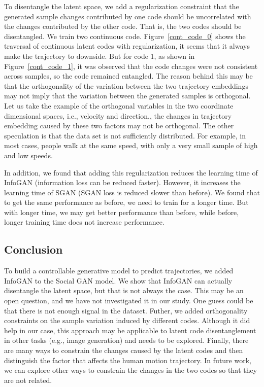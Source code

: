 To disentangle the latent space, we add a regularization constraint that the generated sample changes contributed by one code should be uncorrelated with the changes contributed by the other code. That is, the two codes should be disentangled. We train two continuous code. Figure~\ref{cont_code_0} shows the traversal of continuous latent codes with regularization, it seems that it always make the trajectory to downside. But for code 1, as shown in Figure~\ref{cont_code_1}, it was observed that the code changes were not consistent across samples, so the code remained entangled. The reason behind this may be that the orthogonality of the variation between the two trajectory embeddings may not imply that the variation between the generated samples is orthogonal. Let us take the example of the orthogonal variables in the two coordinate dimensional spaces, i.e., velocity and direction., the changes in trajectory embedding caused by these two factors may not be orthogonal. The other speculation is that the data set is not sufficiently distributed. For example, in most cases, people walk at the same speed, with only a very small sample of high and low speeds.

In addition, we found that adding this regularization reduces the learning time of InfoGAN (information loss can be reduced faster). However, it increases the learning time of SGAN (SGAN loss is reduced slower than before). We found that to get the same performance as before, we need to train for a longer time. But with longer time, we may get better performance than before, while before, longer training time does not increase performance.

\subsection{Conclusion}
To build a controllable generative model to predict trajectories, we added InfoGAN to the Social GAN model. We show that InfoGAN can actually disentangle the latent space, but that is not always the case. This may be an open question, and we have not investigated it in our study. One guess could be that there is not enough signal in the dataset. Futher, we added orthogonality constraints on the sample variation induced by different codes. Although it did help in our case, this approach may be applicable to latent code disentanglement in other tasks (e.g., image generation) and needs to be explored. Finally, there are many ways to constrain the changes caused by the latent codes and then distinguish the factor that affects the human motion trajectory. In future work, we can explore other ways to constrain the changes in the two codes so that they are not related.